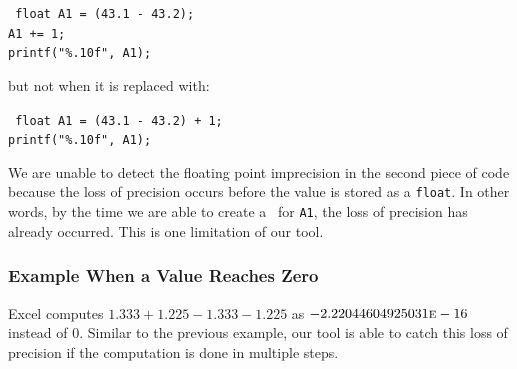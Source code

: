 {\tt\footnotesize
float A1 = (43.1 - 43.2);\\
A1 += 1;\\
printf("\%.10f", A1);
}

but not when it is replaced with:

{\tt\footnotesize
float A1 = (43.1 - 43.2) + 1;\\
printf("\%.10f", A1);
}

We are unable to detect the floating point imprecision in the second piece of code because the loss of precision occurs before the value is stored as a \texttt{float}. In other words, by the time we are able to create a \smartfloat~for \texttt{A1}, the loss of precision has already occurred. This is one limitation of our tool.

\subsubsection{Example When a Value Reaches Zero}

Excel computes $1.333+1.225-1.333-1.225$ as $-2.2204460492\allowbreak5031\text{\sc{e}}-16$ instead of 0. Similar to the previous example, our tool is able to catch this loss of precision if the computation is done in multiple steps.
